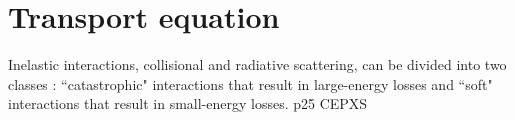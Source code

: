 \section{Transport equation}
Inelastic interactions, collisional and radiative scattering, can be divided
into two classes : ``catastrophic" interactions that result in large-energy
losses and ``soft" interactions that result in small-energy losses. p25 CEPXS
